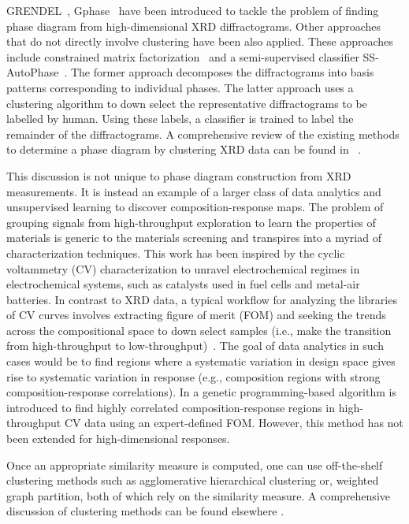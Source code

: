 GRENDEL~\cite{Kusne2015HighthroughputDO}, Gphase~\cite{xiong2017automated} have been introduced to tackle the problem of finding phase diagram from high-dimensional XRD diffractograms.  
Other approaches that do not directly involve clustering have been also applied. 
These approaches include constrained matrix factorization~\cite{bras2010computational} and a semi-supervised classifier SS-AutoPhase~\cite{bunn2016semi}. 
The former approach decomposes the diffractograms into basis patterns corresponding to individual phases. 
The latter approach uses a clustering algorithm to down select the representative diffractograms to be labelled by human. Using these labels, a classifier is trained to label the remainder of the diffractograms.
A comprehensive review of the existing methods to determine a phase diagram by clustering XRD data can be found in ~\cite{hattrick2016perspective}.

This discussion is not unique to phase diagram construction from XRD measurements. It is instead an example of a larger class of data analytics and unsupervised learning to discover composition-response maps.
The problem of grouping signals from high-throughput exploration to learn the properties of materials is generic to the materials screening and transpires into a myriad of characterization techniques. 
This work has been inspired by the cyclic voltammetry (CV) characterization to unravel electrochemical regimes in electrochemical systems, such as catalysts used in fuel cells and metal-air batteries.
In contrast to XRD data, a typical workflow for analyzing the libraries of CV curves involves extracting figure of merit (FOM) and seeking the trends across the compositional space to down select samples (i.e., make the transition from high-throughput to low-throughput)~\cite{haber2014high,haber2014discovering}. 
The goal of data analytics in such cases would be to find regions where a systematic variation in design space gives rise to systematic variation in response (e.g., composition regions with strong composition-response correlations). 
In \cite{suram2015generating} a genetic programming-based algorithm is introduced to find highly correlated composition-response regions in high-throughput CV data using an expert-defined FOM. 
However, this method has not been extended for high-dimensional responses. 



Once an appropriate similarity measure is computed, one can use off-the-shelf clustering methods such as agglomerative hierarchical clustering or, weighted graph partition, both of which rely on the similarity measure. A comprehensive discussion of clustering methods can be found elsewhere \cite{friedman2001elements}.

